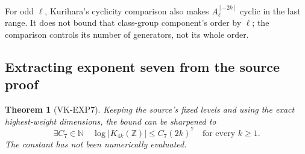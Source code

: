 \documentclass[11pt,a4paper]{article}
\newtheorem{theorem}{Theorem}[section]
\theoremstyle{definition}
\begin{document}
For odd \(\ell\), Kurihara's cyclicity comparison also makes
\(A_\ell^{[-2k]}\) cyclic in the last range. It does not
bound that class-group component's order by \(\ell\);
the comparison controls its number of generators, not its
whole order.

\subsection{Extracting exponent seven from the source proof}

\begin{theorem}[VK-EXP7]
Keeping the source's fixed levels and using the exact
highest-weight dimensions, the bound can be sharpened to
\[
 \exists C_7\in\mathbb N\quad
 \log|K_{4k}(\mathbb Z)|\le C_7(2k)^7
 \quad\text{for every }k\ge1.                       \tag{K13}
\]
The constant has not been numerically evaluated.
\end{theorem}
\end{document}
